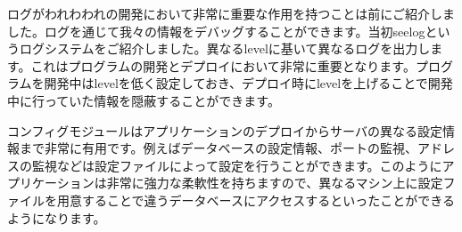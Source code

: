 ログがわれわわれの開発において非常に重要な作用を持つことは前にご紹介しました。ログを通じて我々の情報をデバッグすることができます。当初seelogというログシステムをご紹介しました。異なるlevelに基いて異なるログを出力します。これはプログラムの開発とデプロイにおいて非常に重要となります。プログラムを開発中はlevelを低く設定しておき、デプロイ時にlevelを上げることで開発中に行っていた情報を隠蔽することができます。

コンフィグモジュールはアプリケーションのデプロイからサーバの異なる設定情報まで非常に有用です。例えばデータベースの設定情報、ポートの監視、アドレスの監視などは設定ファイルによって設定を行うことができます。このようにアプリケーションは非常に強力な柔軟性を持ちますので、異なるマシン上に設定ファイルを用意することで違うデータベースにアクセスするといったことができるようになります。
